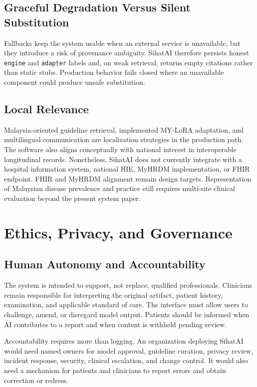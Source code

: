\documentclass[conference]{IEEEtran}
\begin{document}
\subsection{Graceful Degradation Versus Silent Substitution}

Fallbacks keep the system usable when an external service is unavailable, but they introduce a risk of provenance ambiguity. SihatAI therefore persists honest \texttt{engine} and \texttt{adapter} labels and, on weak retrieval, returns empty citations rather than static stubs. Production behavior fails closed where an unavailable component could produce unsafe substitution.

\subsection{Local Relevance}

Malaysia-oriented guideline retrieval, implemented MY-LoRA adaptation, and multilingual communication are localization strategies in the production path. The software also aligns conceptually with national interest in interoperable longitudinal records. Nonetheless, SihatAI does not currently integrate with a hospital information system, national HIE, MyHRDM implementation, or FHIR endpoint. FHIR \cite{hl7fhir} and MyHRDM alignment remain design targets. Representation of Malaysian disease prevalence and practice still requires multi-site clinical evaluation beyond the present system paper.

\section{Ethics, Privacy, and Governance}

\subsection{Human Autonomy and Accountability}

The system is intended to support, not replace, qualified professionals. Clinicians remain responsible for interpreting the original artifact, patient history, examination, and applicable standard of care. The interface must allow users to challenge, amend, or disregard model output. Patients should be informed when AI contributes to a report and when content is withheld pending review.

Accountability requires more than logging. An organization deploying SihatAI would need named owners for model approval, guideline curation, privacy review, incident response, security, clinical escalation, and change control. It would also need a mechanism for patients and clinicians to report errors and obtain correction or redress.
\end{document}
